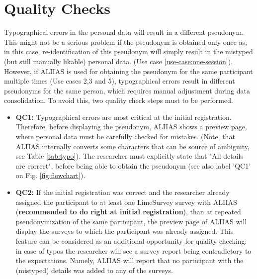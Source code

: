 \section{Quality Checks}
\label{section:qc}
Typographical errors in the personal data will result in a different pseudonym. This might not be a serious problem if the pseudonym is obtained only once as, in this case, re-identification of this pseudonym will simply result in the mistyped (but still manually likable) personal data. (Use case \ref{use-case:one-session}).
However, if ALIIAS is used for obtaining the pseudonym for the same participant multiple times (Use cases 2,3 and 5), typographical errors result in different pseudonyms for the same person, which requires manual adjustment during data consolidation.
To avoid this, two quality check steps must to be performed.
\begin{itemize}
    \item \textbf{QC1:} Typographical errors are most critical at the initial registration. Therefore, before displaying the pseudonym, ALIIAS shows a preview page, where personal data must be carefully checked for mistakes. (Note, that ALIIAS internally converts some characters that can be source of ambiguity, see Table \ref{tab:typo}). The researcher must explicitly state that "All details are correct", before being able to obtain the pseudonym (see also label 'QC1' on Fig. \ref{fig:flowchart}).
    \item \textbf{QC2:} If the initial registration was correct and the researcher already assigned the participant to at least one LimeSurvey survey with ALIIAS (\textbf{recommended to do right at initial registration}), than at repeated pseudonymization of the same participant, the preview page of ALIIAS will display the surveys to which the participant was already assigned. This feature can be considered as an additional opportunity for quality checking: in case of typos the researcher will see a survey report being contradictory to the expectations. Namely, ALIIAS will report that no participant with the (mistyped) details was added to any of the surveys.
\end{itemize}

